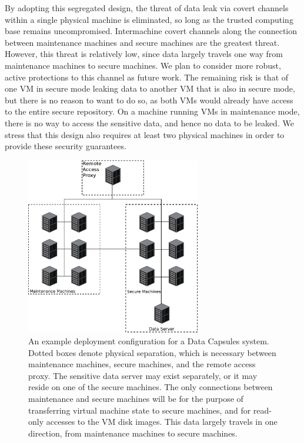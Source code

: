 \documentclass{acm_proc_article-sp}
\begin{document}
By adopting this segregated design, the threat of data leak via covert channels
within a single physical machine is eliminated, so long as the trusted
computing base remains uncompromised.  Intermachine covert channels along the
connection between maintenance machines and secure machines are the greatest
threat.  However, this threat is relatively low, since data largely travels one
way from maintenance machines to secure machines.  We plan to consider more
robust, active protections to this channel as future work.  The remaining risk
is that of one VM in secure mode leaking data to another VM that is also in
secure mode, but there is no reason to want to do so, as both VMs would already
have access to the entire secure repository.  On a machine running VMs in
maintenance mode, there is no way to access the sensitive data, and hence no
data to be leaked.  We stress that this design also requires at least two
physical machines in order to provide these security guarantees.

\begin{figure}[ht!]
\center
\includegraphics[width=3.0in]{figures/configuration}

\caption{An example deployment configuration for a Data Capsules system.
Dotted boxes denote physical separation, which is necessary between maintenance
machines, secure machines, and the remote access proxy.  The sensitive data
server may exist separately, or it may reside on one of the secure machines.
The only connections between maintenance and secure machines will be for the
purpose of transferring virtual machine state to secure machines, and for
read-only accesses to the VM disk images.  This data largely travels in one
direction, from maintenance machines to secure machines.}

\label{fig:configuration}
\end{figure}
\end{document}
